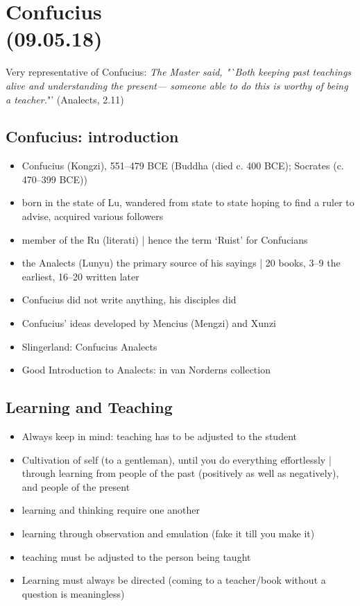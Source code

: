 \documentclass[emulatestandardclasses]{scrartcl}
\begin{document}
\section{Confucius\\(09.05.18)}

Very representative of Confucius: \emph{The Master said, "`Both keeping past teachings alive and understanding the present— someone able to do this is worthy of being a teacher.}"' (Analects, 2.11)



\subsection{Confucius: introduction}

\begin{itemize}
  \item Confucius (Kongzi), 551–479 BCE (Buddha (died c. 400 BCE); Socrates (c. 470–399 BCE))
  \item born in the state of Lu, wandered from state to state hoping to find a ruler to advise, acquired various followers
  \item member of the Ru (literati) | hence the term `Ruist' for Confucians
  \item the Analects (Lunyu) the primary source of his sayings | 20 books, 3–9 the earliest, 16–20 written later
  \item Confucius did not write anything, his disciples did
  \item Confucius’ ideas developed by Mencius (Mengzi) and Xunzi
  \item Slingerland: Confucius Analects
  \item Good Introduction to Analects: in van Norderns collection

\end{itemize}

\subsection{Learning and Teaching}

\begin{itemize}
  \item Always keep in mind: teaching has to be adjusted to the student  
  \item Cultivation of self (to a gentleman), until you do everything effortlessly | through learning from people of the past (positively as well as negatively), and people of the present
  \item learning and thinking require one another
  \item learning through observation and emulation (fake it till you make it)
  \item teaching must be adjusted to the person being taught
  \item Learning must always be directed (coming to a teacher/book without a question is meaningless)
\end{itemize}
\end{document}
